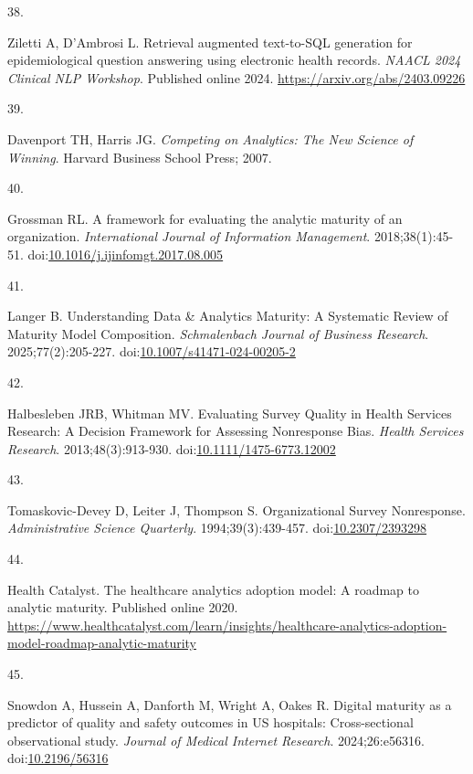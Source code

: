 \documentclass[
  american,
  11pt,
  letterpaper,
  oneside  ,captions=tableheading
]{scrartcl}
\newlength{\cslhangindent}
\newlength{\csllabelwidth}
\newenvironment{CSLReferences}[2] %
 {\begin{list}{}{%
  \setlength{\itemindent}{0pt}
  \setlength{\leftmargin}{0pt}
  \setlength{\parsep}{0pt}
  \ifodd #1
   \setlength{\leftmargin}{\cslhangindent}
   \setlength{\itemindent}{-1\cslhangindent}
  \fi
  \setlength{\itemsep}{#2\baselineskip}}}
 {\end{list}}
\newcommand{\CSLLeftMargin}[1]{\parbox[t]{\csllabelwidth}{\strut#1\strut}}
\newcommand{\CSLRightInline}[1]{\parbox[t]{\linewidth - \csllabelwidth}{\strut#1\strut}}
\begin{document}
\begin{CSLReferences}{0}{1}
\CSLLeftMargin{38. }%
\CSLRightInline{Ziletti A, D'Ambrosi L. {Retrieval augmented text-to-SQL
generation for epidemiological question answering using electronic
health records}. \emph{{NAACL} 2024 Clinical {NLP} Workshop}. Published
online 2024. \url{https://arxiv.org/abs/2403.09226}}

\CSLLeftMargin{39. }%
\CSLRightInline{Davenport TH, Harris JG. \emph{{Competing on Analytics:
The New Science of Winning}}. Harvard Business School Press; 2007.}

\CSLLeftMargin{40. }%
\CSLRightInline{Grossman RL. {A framework for evaluating the analytic
maturity of an organization}. \emph{International Journal of Information
Management}. 2018;38(1):45-51.
doi:\href{https://doi.org/10.1016/j.ijinfomgt.2017.08.005}{10.1016/j.ijinfomgt.2017.08.005}}

\CSLLeftMargin{41. }%
\CSLRightInline{Langer B. {Understanding Data \& Analytics Maturity: A
Systematic Review of Maturity Model Composition}. \emph{Schmalenbach
Journal of Business Research}. 2025;77(2):205-227.
doi:\href{https://doi.org/10.1007/s41471-024-00205-2}{10.1007/s41471-024-00205-2}}

\CSLLeftMargin{42. }%
\CSLRightInline{Halbesleben JRB, Whitman MV. {Evaluating Survey Quality
in Health Services Research: A Decision Framework for Assessing
Nonresponse Bias}. \emph{Health Services Research}. 2013;48(3):913-930.
doi:\href{https://doi.org/10.1111/1475-6773.12002}{10.1111/1475-6773.12002}}

\CSLLeftMargin{43. }%
\CSLRightInline{Tomaskovic-Devey D, Leiter J, Thompson S.
{Organizational Survey Nonresponse}. \emph{Administrative Science
Quarterly}. 1994;39(3):439-457.
doi:\href{https://doi.org/10.2307/2393298}{10.2307/2393298}}

\CSLLeftMargin{44. }%
\CSLRightInline{Health Catalyst. {The healthcare analytics adoption
model: A roadmap to analytic maturity}. Published online 2020.
\url{https://www.healthcatalyst.com/learn/insights/healthcare-analytics-adoption-model-roadmap-analytic-maturity}}

\CSLLeftMargin{45. }%
\CSLRightInline{Snowdon A, Hussein A, Danforth M, Wright A, Oakes R.
{Digital maturity as a predictor of quality and safety outcomes in {US}
hospitals: Cross-sectional observational study}. \emph{Journal of
Medical Internet Research}. 2024;26:e56316.
doi:\href{https://doi.org/10.2196/56316}{10.2196/56316}}


\end{CSLReferences}
\end{document}
